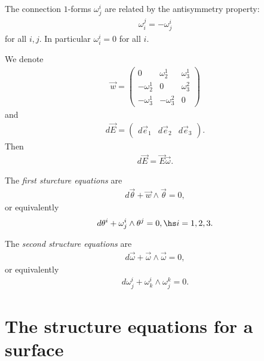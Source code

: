 \documentclass{article}
\begin{document}
\begin{proposition}
	The connection $1$-forms $\omega_j^i$ are related by the antisymmetry property:
	\begin{align*}
		\omega_i^j = -\omega_j^i
	\end{align*}
	for all $i,j$. In particular $\omega_i^i = 0$ for all $i$.
\end{proposition}

\begin{lemma}
	We denote
	\begin{align*}
		\vec w = \begin{pmatrix}
			         0           & \omega_2^1  & \omega_3^1 \\
			         -\omega_2^1 & 0           & \omega_3^2 \\
			         -\omega_3^1 & -\omega_3^2 & 0
		         \end{pmatrix}
	\end{align*}
	and
	\begin{align*}
		d\vec E = \begin{pmatrix}
			          d\vec e_1 & d\vec e_2 & d\vec e_3
		          \end{pmatrix}.
	\end{align*}
	Then
	\begin{align*}
		d\vec E = \vec E\vec\omega.
	\end{align*}
\end{lemma}

\begin{theorem}
	The \emph{first sturcture equations} are
	\begin{align*}
		d\vec\theta + \vec w \wedge \vec \theta = 0,
	\end{align*}
	or equivalently
	\begin{align*}
		d\theta^i + \omega_j^i \wedge \theta^j = 0,\hs i=1,2,3.
	\end{align*}
\end{theorem}

\begin{theorem}
	The \emph{second structure equations} are
	\begin{align*}
		d\vec\omega + \vec \omega \wedge\vec \omega = 0,
	\end{align*}
	or equivalently
	\begin{align*}
		d\omega_j^i + \omega_k^i\wedge\omega_j^k=0.
	\end{align*}
\end{theorem}

\section{The structure equations for a surface}
\end{document}

